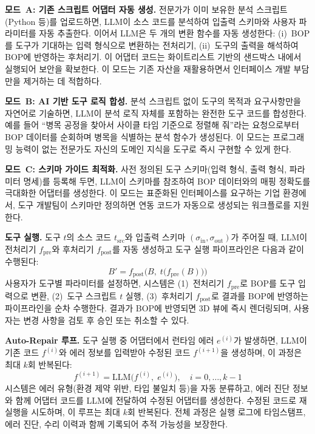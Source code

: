 \documentclass[conference]{IEEEtran}
\begin{document}
\textbf{모드~A: 기존 스크립트 어댑터 자동 생성.}
전문가가 이미 보유한 분석 스크립트(Python 등)를 업로드하면, LLM이 소스 코드를 분석하여 입출력 스키마와 사용자 파라미터를 자동 추출한다. 이어서 LLM은 두 개의 변환 함수를 자동 생성한다: (i)~BOP를 도구가 기대하는 입력 형식으로 변환하는 전처리기, (ii)~도구의 출력을 해석하여 BOP에 반영하는 후처리기. 이 어댑터 코드는 화이트리스트 기반의 샌드박스 내에서 실행되어 보안을 확보한다. 이 모드는 기존 자산을 재활용하면서 인터페이스 개발 부담만을 제거하는 데 적합하다.

\textbf{모드~B: AI 기반 도구 로직 합성.}
분석 스크립트 없이 도구의 목적과 요구사항만을 자연어로 기술하면, LLM이 분석 로직 자체를 포함하는 완전한 도구 코드를 합성한다. 예를 들어 ``병목 공정을 찾아서 사이클 타임 기준으로 정렬해 줘''라는 요청으로부터 BOP 데이터를 순회하며 병목을 식별하는 분석 함수가 생성된다. 이 모드는 프로그래밍 능력이 없는 전문가도 자신의 도메인 지식을 도구로 즉시 구현할 수 있게 한다.

\textbf{모드~C: 스키마 가이드 최적화.}
사전 정의된 도구 스키마(입력 형식, 출력 형식, 파라미터 명세)를 등록해 두면, LLM이 스키마를 참조하여 BOP 데이터와의 매핑 정확도를 극대화한 어댑터를 생성한다. 이 모드는 표준화된 인터페이스를 요구하는 기업 환경에서, 도구 개발팀이 스키마만 정의하면 연동 코드가 자동으로 생성되는 워크플로를 지원한다.

\textbf{도구 실행.}
도구 $t$의 소스 코드 $t_{\mathrm{src}}$와 입출력 스키마 $(\sigma_{\mathrm{in}}, \sigma_{\mathrm{out}})$가 주어질 때, LLM이 전처리기 $f_{\mathrm{pre}}$와 후처리기 $f_{\mathrm{post}}$를 자동 생성하고 도구 실행 파이프라인은 다음과 같이 수행된다:
\begin{equation}
B' = f_{\mathrm{post}}\bigl(B,\; t\bigl(f_{\mathrm{pre}}(B)\bigr)\bigr)
\label{eq:step2}
\end{equation}
사용자가 도구별 파라미터를 설정하면, 시스템은 (1)~전처리기 $f_{\mathrm{pre}}$로 BOP를 도구 입력으로 변환, (2)~도구 스크립트 $t$ 실행, (3)~후처리기 $f_{\mathrm{post}}$로 결과를 BOP에 반영하는 파이프라인을 순차 수행한다. 결과가 BOP에 반영되면 3D 뷰에 즉시 렌더링되며, 사용자는 변경 사항을 검토 후 승인 또는 취소할 수 있다.

\textbf{Auto-Repair 루프.}
도구 실행 중 어댑터에서 런타임 에러 $e^{(i)}$가 발생하면, LLM이 기존 코드 $f^{(i)}$와 에러 정보를 입력받아 수정된 코드 $f^{(i+1)}$을 생성하며, 이 과정은 최대 $k$회 반복된다:
\begin{equation}
f^{(i+1)} = \mathrm{LLM}\bigl(f^{(i)},\; e^{(i)}\bigr), \quad i = 0, \ldots, k{-}1
\label{eq:repair}
\end{equation}
시스템은 에러 유형(환경 제약 위반, 타입 불일치 등)을 자동 분류하고, 에러 진단 정보와 함께 어댑터 코드를 LLM에 전달하여 수정된 어댑터를 생성한다. 수정된 코드로 재실행을 시도하며, 이 루프는 최대 $k$회 반복된다. 전체 과정은 실행 로그에 타임스탬프, 에러 진단, 수리 이력과 함께 기록되어 추적 가능성을 보장한다.
\end{document}
